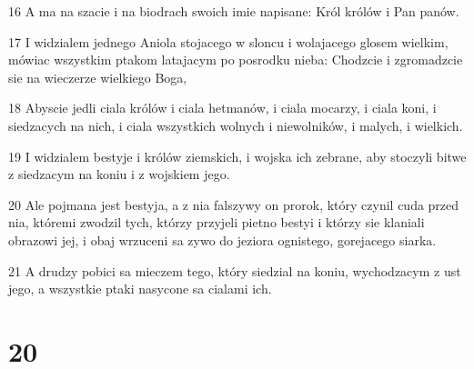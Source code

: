 \par 16 A ma na szacie i na biodrach swoich imie napisane: Król królów i Pan panów.
\par 17 I widzialem jednego Aniola stojacego w sloncu i wolajacego glosem wielkim, mówiac wszystkim ptakom latajacym po posrodku nieba: Chodzcie i zgromadzcie sie na wieczerze wielkiego Boga,
\par 18 Abyscie jedli ciala królów i ciala hetmanów, i ciala mocarzy, i ciala koni, i siedzacych na nich, i ciala wszystkich wolnych i niewolników, i malych, i wielkich.
\par 19 I widzialem bestyje i królów ziemskich, i wojska ich zebrane, aby stoczyli bitwe z siedzacym na koniu i z wojskiem jego.
\par 20 Ale pojmana jest bestyja, a z nia falszywy on prorok, który czynil cuda przed nia, któremi zwodzil tych, którzy przyjeli pietno bestyi i którzy sie klaniali obrazowi jej, i obaj wrzuceni sa zywo do jeziora ognistego, gorejacego siarka.
\par 21 A drudzy pobici sa mieczem tego, który siedzial na koniu, wychodzacym z ust jego, a wszystkie ptaki nasycone sa cialami ich.

\chapter{20}

